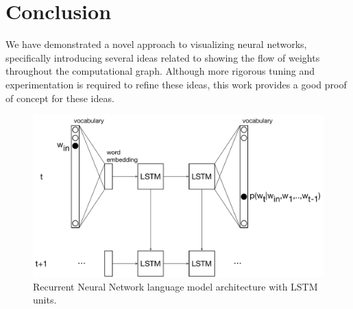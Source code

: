 \documentclass[journal]{vgtc}                %
\begin{document}
\section{Conclusion}
We have demonstrated a novel approach to visualizing neural networks, specifically introducing several ideas related to showing the flow of weights throughout the computational graph.
Although more rigorous tuning and experimentation is required to refine these ideas, this work provides a good proof of concept for these ideas.

%

%
%
%



\begin{figure}[tb]
 \centering %
 \includegraphics[width=\linewidth]{lstm-lm-small.pdf}
 \caption{Recurrent Neural Network language model architecture with LSTM units.}
 \label{fig:lstm_rnn}
\end{figure}
\end{document}
